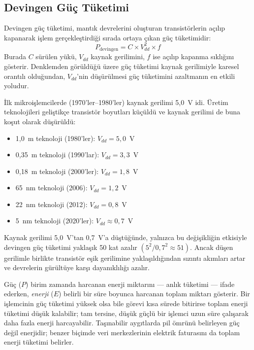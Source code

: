 \subsection{Devingen Güç Tüketimi}
\label{sec:devingen-guc}

Devingen güç tüketimi, mantık devrelerini oluşturan transistörlerin açılıp kapanarak işlem gerçekleştirdiği sırada ortaya çıkan güç tüketimidir:
\begin{equation}
P_{\text{devingen}} = C \times V_{dd}^2 \times f
\label{eq:devingen-guc}
\end{equation}
Burada $C$ sürülen yükü, $V_{dd}$ kaynak gerilimini, $f$ ise açılıp kapanma sıklığını gösterir. Denklemden görüldüğü üzere güç tüketimi kaynak gerilimiyle karesel orantılı olduğundan, $V_{dd}$'nin düşürülmesi güç tüketimini azaltmanın en etkili yoludur.

\begin{bilginot}
İlk mikroişlemcilerde (1970'ler--1980'ler) kaynak gerilimi 5{,}0~V idi. Üretim teknolojileri geliştikçe transistör boyutları küçüldü ve kaynak gerilimi de buna koşut olarak düşürüldü:
\begin{itemize}[nosep]
    \item 1{,}0~\textmu m teknoloji (1980'ler): $V_{dd} = 5{,}0$~V
    \item 0{,}35~\textmu m teknoloji (1990'lar): $V_{dd} = 3{,}3$~V
    \item 0{,}18~\textmu m teknoloji (2000'ler): $V_{dd} = 1{,}8$~V
    \item 65~nm teknoloji (2006): $V_{dd} = 1{,}2$~V
    \item 22~nm teknoloji (2012): $V_{dd} = 0{,}8$~V
    \item 5~nm teknoloji (2020'ler): $V_{dd} \approx 0{,}7$~V
\end{itemize}
Kaynak gerilimi 5{,}0~V'tan 0{,}7~V'a düştüğünde, yalnızca bu değişikliğin etkisiyle devingen güç tüketimi yaklaşık 50 kat azalır $(5^2 / 0{,}7^2 \approx 51)$. Ancak düşen gerilimle birlikte transistör eşik gerilimine yaklaşıldığından sızıntı akımları artar ve devrelerin gürültüye karşı dayanıklılığı azalır.
\end{bilginot}

Güç ($P$) birim zamanda harcanan enerji miktarını --- anlık tüketimi --- ifade ederken, \emph{enerji} ($E$) belirli bir süre boyunca harcanan toplam miktarı gösterir. Bir işlemcinin güç tüketimi yüksek olsa bile görevi kısa sürede bitirirse toplam enerji tüketimi düşük kalabilir; tam tersine, düşük güçlü bir işlemci uzun süre çalışarak daha fazla enerji harcayabilir. Taşınabilir aygıtlarda pil ömrünü belirleyen güç değil enerjidir; benzer biçimde veri merkezlerinin elektrik faturasını da toplam enerji tüketimi belirler.

